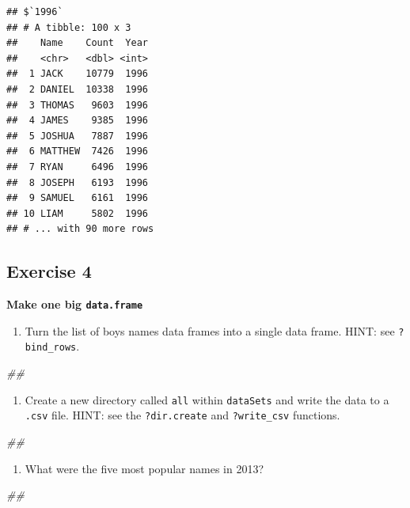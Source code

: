 \documentclass[]{book}
\newenvironment{Shaded}{\begin{snugshade}}{\end{snugshade}}
\newcommand{\CommentTok}[1]{\textcolor[rgb]{0.56,0.35,0.01}{\textit{#1}}}
\providecommand{\tightlist}{%
  \setlength{\itemsep}{0pt}\setlength{\parskip}{0pt}}
\begin{document}
\begin{verbatim}
## $`1996`
## # A tibble: 100 x 3
##    Name    Count  Year
##    <chr>   <dbl> <int>
##  1 JACK    10779  1996
##  2 DANIEL  10338  1996
##  3 THOMAS   9603  1996
##  4 JAMES    9385  1996
##  5 JOSHUA   7887  1996
##  6 MATTHEW  7426  1996
##  7 RYAN     6496  1996
##  8 JOSEPH   6193  1996
##  9 SAMUEL   6161  1996
## 10 LIAM     5802  1996
## # ... with 90 more rows
\end{verbatim}

\hypertarget{exercise-4-1}{%
\subsection{Exercise 4}\label{exercise-4-1}}

\textbf{Make one big \texttt{data.frame}}

\begin{enumerate}
\def\labelenumi{\arabic{enumi}.}
\tightlist
\item
  Turn the list of boys names data frames into a single data frame. HINT: see \texttt{?bind\_rows}.
\end{enumerate}

\begin{Shaded}
\begin{Highlighting}[]
\CommentTok{## }
\end{Highlighting}
\end{Shaded}

\begin{enumerate}
\def\labelenumi{\arabic{enumi}.}
\setcounter{enumi}{1}
\tightlist
\item
  Create a new directory called \texttt{all} within \texttt{dataSets} and write the data to a \texttt{.csv} file.
  HINT: see the \texttt{?dir.create} and \texttt{?write\_csv} functions.
\end{enumerate}

\begin{Shaded}
\begin{Highlighting}[]
\CommentTok{## }
\end{Highlighting}
\end{Shaded}

\begin{enumerate}
\def\labelenumi{\arabic{enumi}.}
\setcounter{enumi}{2}
\tightlist
\item
  What were the five most popular names in 2013?
\end{enumerate}

\begin{Shaded}
\begin{Highlighting}[]
\CommentTok{## }
\end{Highlighting}
\end{Shaded}
\end{document}
